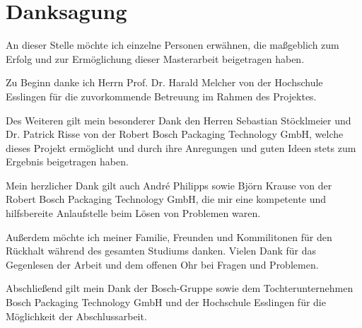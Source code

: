 \chapter*{Danksagung}
\thispagestyle{empty}

An dieser Stelle möchte ich einzelne Personen erwähnen, die maßgeblich zum Erfolg und zur Ermöglichung dieser
Masterarbeit beigetragen haben.

Zu Beginn danke ich Herrn Prof. Dr. Harald Melcher von der Hochschule Esslingen für die zuvorkommende Betreuung im
Rahmen des Projektes.

Des Weiteren gilt mein besonderer Dank den Herren Sebastian Stöcklmeier und Dr. Patrick Risse von der Robert Bosch
Packaging Technology GmbH, welche dieses Projekt ermöglicht und durch ihre Anregungen und guten Ideen stets zum Ergebnis
beigetragen haben.

Mein herzlicher Dank gilt auch André Philipps sowie Björn Krause von der Robert Bosch Packaging Technology GmbH, die mir
eine kompetente und hilfsbereite Anlaufstelle beim Lösen von Problemen waren.

Außerdem möchte ich meiner Familie, Freunden und Kommilitonen für den Rückhalt während des gesamten Studiums danken.
Vielen Dank für das Gegenlesen der Arbeit und dem offenen Ohr bei Fragen und Problemen.

Abschließend gilt mein Dank der Bosch-Gruppe sowie dem Tochterunternehmen Bosch Packaging Technology GmbH und der
Hochschule Esslingen für die Möglichkeit der Abschlussarbeit.